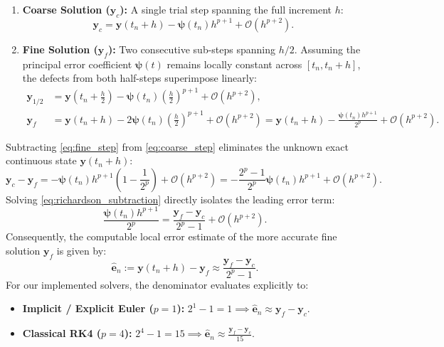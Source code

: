 \begin{enumerate}
    \item \textbf{Coarse Solution ($\mathbf{y}_c$):} A single trial step spanning the full increment $h$:
    \begin{equation}
    \label{eq:coarse_step}
    \mathbf{y}_c = \mathbf{y}(t_n + h) - \boldsymbol{\psi}(t_n) h^{p+1} + \mathcal{O}(h^{p+2}).
    \end{equation}
    \item \textbf{Fine Solution ($\mathbf{y}_f$):} Two consecutive sub-steps spanning $h/2$. Assuming the principal error coefficient $\boldsymbol{\psi}(t)$ remains locally constant across $[t_n, t_n + h]$, the defects from both half-steps superimpose linearly:
    \begin{align}
    \mathbf{y}_{1/2} &= \mathbf{y}\left(t_n + \frac{h}{2}\right) - \boldsymbol{\psi}(t_n) \left(\frac{h}{2}\right)^{p+1} + \mathcal{O}(h^{p+2}), \label{eq:fine_half_step} \\
    \mathbf{y}_f &= \mathbf{y}(t_n + h) - 2 \boldsymbol{\psi}(t_n) \left(\frac{h}{2}\right)^{p+1} + \mathcal{O}(h^{p+2}) = \mathbf{y}(t_n + h) - \frac{\boldsymbol{\psi}(t_n) h^{p+1}}{2^p} + \mathcal{O}(h^{p+2}). \label{eq:fine_step}
    \end{align}
\end{enumerate}
Subtracting \eqref{eq:fine_step} from \eqref{eq:coarse_step} eliminates the unknown exact continuous state $\mathbf{y}(t_n + h)$:
\begin{equation}
\label{eq:richardson_subtraction}
\mathbf{y}_c - \mathbf{y}_f = -\boldsymbol{\psi}(t_n) h^{p+1} \left(1 - \frac{1}{2^p}\right) + \mathcal{O}(h^{p+2}) = -\frac{2^p - 1}{2^p} \boldsymbol{\psi}(t_n) h^{p+1} + \mathcal{O}(h^{p+2}).
\end{equation}
Solving \eqref{eq:richardson_subtraction} directly isolates the leading error term:
\begin{equation}
\label{eq:principal_error_isolated}
\frac{\boldsymbol{\psi}(t_n) h^{p+1}}{2^p} = \frac{\mathbf{y}_f - \mathbf{y}_c}{2^p - 1} + \mathcal{O}(h^{p+2}).
\end{equation}
Consequently, the computable local error estimate of the more accurate fine solution $\mathbf{y}_f$ is given by:
\begin{equation}
\label{eq:local_error_estimator}
\hat{\mathbf{e}}_n := \mathbf{y}(t_n + h) - \mathbf{y}_f \approx \frac{\mathbf{y}_f - \mathbf{y}_c}{2^p - 1}.
\end{equation}
For our implemented solvers, the denominator evaluates explicitly to:
\begin{itemize}
    \item \textbf{Implicit / Explicit Euler ($p=1$):} $2^1 - 1 = 1 \implies \hat{\mathbf{e}}_n \approx \mathbf{y}_f - \mathbf{y}_c$.
    \item \textbf{Classical RK4 ($p=4$):} $2^4 - 1 = 15 \implies \hat{\mathbf{e}}_n \approx \frac{\mathbf{y}_f - \mathbf{y}_c}{15}$.
\end{itemize}

